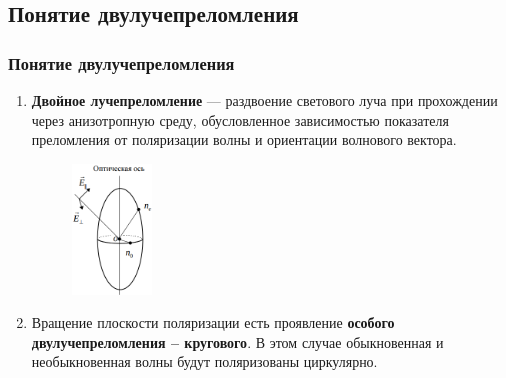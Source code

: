 \documentclass[10pt,pdf,hyperref={unicode}, dvipsnames, handout]{beamer}
\begin{document}
\begin{frame}[t]
	\subsection{Понятие двулучепреломления}
	\frametitle{Понятие двулучепреломления}
	\begin{enumerate}
		\item \textbf{Двойное лучепреломление} — раздвоение светового луча при прохождении через анизотропную среду, обусловленное зависимостью показателя преломления от поляризации волны и ориентации волнового вектора. 
			\begin{figure}[tb]
				\centering
				\includegraphics[width=0.2\textwidth]{img/ell}
			\end{figure}		
		\item Вращение плоскости поляризации есть проявление \textbf{особого двулучепреломления -- кругового}. В этом случае обыкновенная и необыкновенная волны будут поляризованы циркулярно.
	\end{enumerate}


\end{frame}
\end{document}
